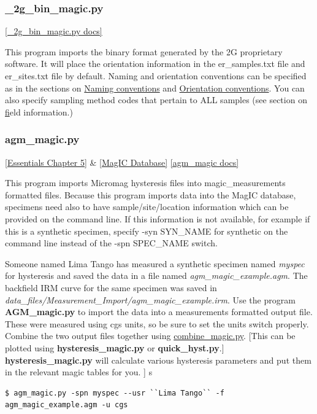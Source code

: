 \documentclass[11pt]{book}
\begin{document}
{{{{\subsubsection{\_2g\_bin\_magic.py}
\href{https://github.com/PmagPy/PmagPy/blob/master/programs/_2G_bin_magic.py}{[\_2g\_bin\_magic.py docs]}

This program imports the binary format generated by the 2G proprietary software.   It will place the orientation information in the er\_samples.txt file and er\_sites.txt file by default.  Naming and orientation conventions can be specified as in the sections on \href{#naming_schemes}{Naming conventions} and \href{#orientation_schemes}{Orientation conventions}.  You can also specify sampling method codes that pertain to ALL samples (see section on \href{#field_info} field information.)



\subsubsection {agm\_magic.py} \href{http://earthref.org/MAGIC/books/Tauxe/Essentials/WebBook3ch5.html#ch5}{[Essentials Chapter 5]} \& \href{#MagICDatabase}{[MagIC Database]}
\href{https://github.com/PmagPy/PmagPy/blob/master/programs/agm_magic.py}{[agm\_magic docs]}


This program imports Micromag  hysteresis files into magic\_measurements formatted files.
Because this program imports data into the MagIC database, specimens need also to have sample/site/location information which can be provided on the command line. If this information is not available, for example if this is a synthetic specimen,  specify -syn  SYN\_NAME for synthetic on the command line instead of the -spn SPEC\_NAME switch.

Someone named Lima Tango has measured a  synthetic specimen named {\it myspec}  for hysteresis and saved the data in a file named {\it agm\_magic\_example.agm}.   The backfield IRM curve for the same specimen was saved in {\it data\_files/Measurement\_Import/agm\_magic_example.irm}.  Use the program {\bf AGM\_magic.py} to import the data into a measurements formatted output file.  These were measured using cgs units, so be sure to set the units switch properly.   Combine the two output files together using \href{#combine_magic.py}{combine\_magic.py}.    [This can be plotted using {\bf hysteresis\_magic.py} or {\bf quick\_hyst.py}.]    {\bf hysteresis\_magic.py} will calculate various hysteresis parameters and put them in the relevant magic tables for you.  ]
s
\begin{verbatim}
$ agm_magic.py -spn myspec --usr ``Lima Tango`` -f agm_magic_example.agm -u cgs


\end{verbatim}}}}}
\end{document}
